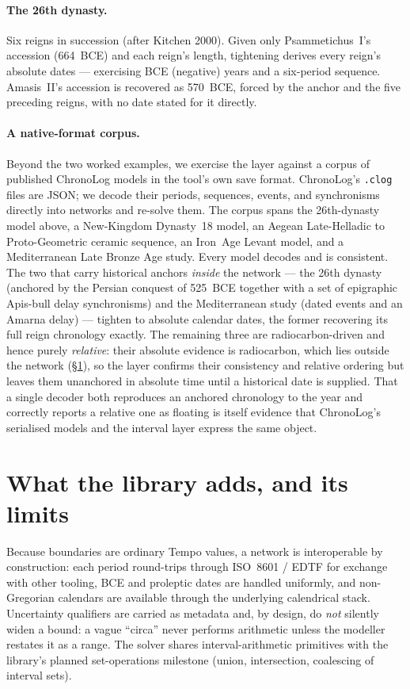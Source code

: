 \documentclass[a4paper,USenglish,cleveref,autoref,thm-restate]{oasics-v2021}
\begin{document}
\paragraph{The 26th dynasty.} Six reigns in succession (after Kitchen
2000). Given only Psammetichus~I's accession (664~BCE) and each reign's
length, tightening derives every reign's absolute dates --- exercising
BCE (negative) years and a six-period sequence. Amasis~II's accession is
recovered as 570~BCE, forced by the anchor and the five preceding
reigns, with no date stated for it directly.

\paragraph{A native-format corpus.} Beyond the two worked examples, we
exercise the layer against a corpus of published ChronoLog models in the
tool's own save format. ChronoLog's \texttt{.clog} files are JSON; we
decode their periods, sequences, events, and synchronisms directly into
networks and re-solve them. The corpus spans the 26th-dynasty model
above, a New-Kingdom Dynasty~18 model, an Aegean Late-Helladic to
Proto-Geometric ceramic sequence, an Iron~Age Levant model, and a
Mediterranean Late Bronze Age study. Every model decodes and is
consistent. The two that carry historical anchors \emph{inside} the
network --- the 26th dynasty (anchored by the Persian conquest of
525~BCE together with a set of epigraphic Apis-bull delay synchronisms)
and the Mediterranean study (dated events and an Amarna delay) ---
tighten to absolute calendar dates, the former recovering its full reign
chronology exactly. The remaining three are radiocarbon-driven and hence
purely \emph{relative}: their absolute evidence is radiocarbon, which
lies outside the network (§\ref{sec:beyond}), so the layer confirms their
consistency and relative ordering but leaves them unanchored in absolute
time until a historical date is supplied. That a single decoder both
reproduces an anchored chronology to the year and correctly reports a
relative one as floating is itself evidence that ChronoLog's serialised
models and the interval layer express the same object.

\section{What the library adds, and its limits}
\label{sec:beyond}

Because boundaries are ordinary Tempo values, a network is interoperable
by construction: each period round-trips through ISO~8601 / EDTF for
exchange with other tooling, BCE and proleptic dates are handled
uniformly, and non-Gregorian calendars are available through the
underlying calendrical stack. Uncertainty qualifiers are carried as
metadata and, by design, do \emph{not} silently widen a bound: a vague
``circa'' never performs arithmetic unless the modeller restates it as a
range. The solver shares interval-arithmetic primitives with the
library's planned set-operations milestone (union, intersection,
coalescing of interval sets).
\end{document}
